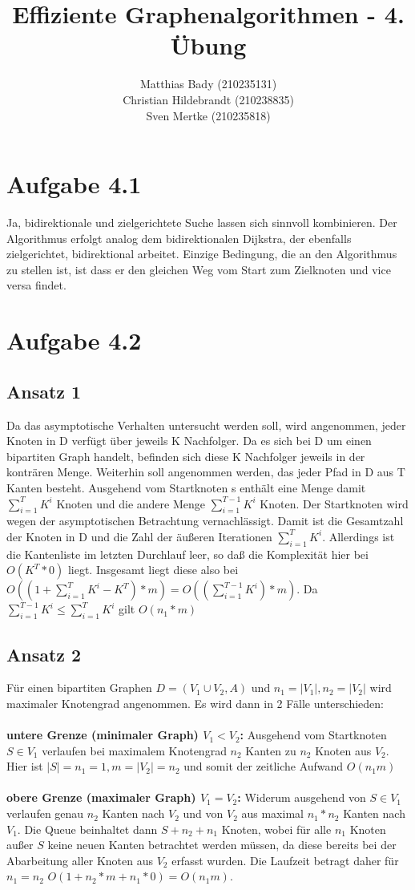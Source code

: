\documentclass{scrartcl}
\title{Effiziente Graphenalgorithmen - 4. Übung}
\author{Matthias Bady (210235131)\\ Christian Hildebrandt (210238835)\\ Sven Mertke (210235818)}
\begin{document}
\maketitle
\section{Aufgabe 4.1}
Ja, bidirektionale und zielgerichtete Suche lassen sich sinnvoll kombinieren. Der Algorithmus erfolgt analog dem bidirektionalen Dijkstra, der ebenfalls zielgerichtet, bidirektional arbeitet. Einzige Bedingung, die an den Algorithmus zu stellen ist, ist dass er den gleichen Weg vom Start zum Zielknoten und vice versa findet.
\section{Aufgabe 4.2}
\subsection*{Ansatz 1}
Da das asymptotische Verhalten untersucht werden soll, wird angenommen, jeder Knoten in D verfügt über jeweils K Nachfolger. Da es sich bei D um einen bipartiten Graph handelt, befinden sich diese K Nachfolger jeweils in der konträren Menge. Weiterhin soll angenommen werden, das jeder Pfad in D aus T Kanten besteht. Ausgehend vom Startknoten s enthält eine Menge damit $\sum_{i=1}^{T}{K^i}$ Knoten und die andere Menge $\sum_{i=1}^{T-1}{K^i}$ Knoten. Der Startknoten wird wegen der asymptotischen Betrachtung vernachlässigt. Damit ist die Gesamtzahl der Knoten in D und die Zahl der äußeren Iterationen $\sum_{i=1}^{T}{K^i}$. Allerdings ist die Kantenliste im letzten Durchlauf leer, so daß die Komplexität hier bei $O(K^T*0)$ liegt. Insgesamt liegt diese also bei $O((1+\sum_{i=1}^{T}{K^i} - K^T)*m) = O((\sum_{i=1}^{T-1}{K^i})*m)$. Da $\sum_{i=1}^{T-1}{K^i} \leq \sum_{i=1}^{T}{K^i}$ gilt $O(n_1*m)$

\subsection*{Ansatz 2}
Für einen bipartiten Graphen $D=(V_1 \cup V_2, A)$ und $n_1=|V_1|, n_2=|V_2|$ wird maximaler Knotengrad angenommen. Es wird dann in 2 Fälle unterschieden:
\\\\
\textbf{untere Grenze (minimaler Graph) $V_1 < V_2$:}
Ausgehend vom Startknoten $S \in V_1$ verlaufen bei maximalem Knotengrad $n_2$ Kanten zu $n_2$ Knoten aus $V_2$. Hier ist \mbox{$|S|=n_1=1, m=|V_2|=n_2$} und somit der zeitliche Aufwand $O(n_{1}m)$
\\\\
\textbf{obere Grenze (maximaler Graph) $V_1 = V_2$:}
Widerum ausgehend von $S \in V_1$ verlaufen genau $n_2$ Kanten nach $V_2$ und von $V_2$ aus maximal $n_1*n_2$ Kanten nach $V_1$. Die Queue beinhaltet dann $S+n_2+n_1$ Knoten, wobei für alle $n_1$ Knoten außer $S$ keine neuen Kanten betrachtet werden müssen, da diese bereits bei der Abarbeitung aller Knoten aus $V_2$ erfasst wurden. Die Laufzeit betragt daher für $n_1=n_2$ \mbox{$O(1+n_2*m+n_1*0)=O(n_{1}m)$}.
\end{document}
